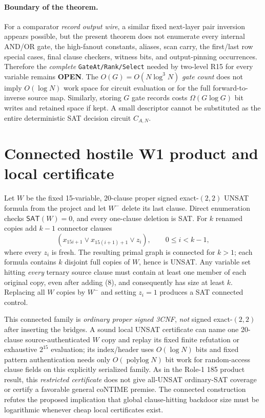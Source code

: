 \documentclass[11pt]{article}
\newcommand{\SAT}{\mathsf{SAT}}
\begin{document}
\paragraph{Boundary of the theorem.}
For a comparator \emph{record output wire}, a similar fixed
next-layer pair inversion appears possible, but the present
theorem does not enumerate every internal AND/OR gate, the
high-fanout constants, aliases, scan carry, the first/last
row special cases, final clause checkers, witness bits, and
output-pinning occurrences. Therefore the \emph{complete}
\texttt{GateAt/Rank/Select} needed by two-level R15 for
every variable remains \textbf{OPEN}.
The $O(G)=O(N\log^3N)$ \emph{gate count} does not imply
$O(\log N)$ work space for circuit evaluation or for the
full forward-to-inverse source map. Similarly, storing
$G$ gate records costs $\Omega(G\log G)$ bit writes and
retained space if kept. A small descriptor cannot
be substituted as the entire deterministic SAT
decision circuit $C_{A,N}$.

\section{Connected hostile W1 product and local certificate}
Let $W$ be the fixed 15-variable, 20-clause proper signed
exact-$(2,2)$ UNSAT formula from the project and let
$W^-$ delete its last clause. Direct enumeration checks
$\SAT(W)=0$, and every one-clause deletion is SAT.
For $k$ renamed copies add $k-1$ connector clauses
\[
 (x_{15i+1}\vee x_{15(i+1)+1}\vee z_i),
 \qquad 0\le i<k-1,                                     \tag{8}
\]
where every $z_i$ is fresh. The resulting primal graph
is connected for $k>1$; each formula contains $k$ disjoint
full copies of $W$, hence is UNSAT. Any variable set
hitting \emph{every} ternary source clause must contain
at least one member of each original copy, even after adding
(8), and consequently has size at least $k$.
Replacing all $W$ copies by $W^-$ and setting
$z_i=1$ produces a SAT connected control.

This connected family is \emph{ordinary proper signed 3CNF},
\emph{not} signed exact-$(2,2)$ after inserting the bridges.
A sound local UNSAT certificate can name one 20-clause
source-authenticated $W$ copy and replay its fixed
finite refutation or exhaustive $2^{15}$ evaluation;
its index/header uses $O(\log N)$ bits and fixed pattern
authentication needs only $O(\operatorname{polylog}N)$ bit work
for random-access clause fields on this explicitly
serialized family. As in the Role-1 185 product result,
this \emph{restricted certificate} does not give
all-UNSAT ordinary-SAT coverage or certify a favorable
general coNTIME premise. The connected construction
refutes the proposed implication that global
clause-hitting backdoor size must be logarithmic
whenever cheap local certificates exist.
\end{document}

